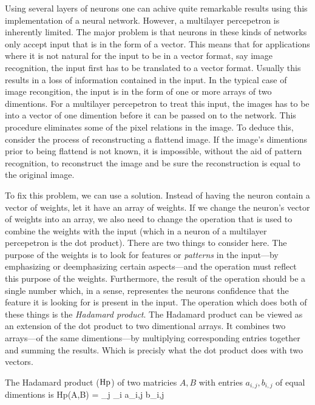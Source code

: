 Using several layers of neurons one can achive quite remarkable results using this implementation of a neural network.
However, a multilayer percepetron is inherently limited.
The major problem is that neurons in these kinds of networks only accept input that is in the form of a vector.
This means that for applications where it is not natural for the input to be in a vector format, say image recognition, the input first has to be translated to a vector format.
Usually this results in a loss of information contained in the input.
In the typical case of image recongition, the input is in the form of one or more arrays of two dimentions.
For a multilayer percepetron to treat this input, the images has to be  into a vector of one dimention before it can be passed on to the network.
This procedure eliminates some of the pixel relations in the image.
To deduce this, consider the process of reconstructing a flattend image.
If the image's dimentions prior to being flattend is not known, it is impossible, without the aid of pattern recognition, to reconstruct the image and be sure the reconstruction is equal to the original image.

To fix this problem, we can use a  solution.
Instead of having the neuron contain a vector of weights, let it have an array of weights.
If we change the neuron's vector of weights into an array, we also need to change the operation that is used to combine the weights with the input (which in a neuron of a multilayer percepetron is the dot product).
There are two things to consider here.
The purpose of the weights is to look for features or {\em patterns} in the input---by emphasizing or deemphasizing certain aspects---and the operation must reflect this purpose of the weights.
Furthermore, the result of the operation should be a single number which, in a sense, representes the neurons  confidence that the feature it is looking for is present in the input.
The operation which does both of these things is the {\em Hadamard product}.
The Hadamard product can be viewed as an extension of the dot product to two dimentional arrays.
It combines two arrays---of the same dimentions---by multiplying corresponding entries together and summing the results.
Which is precisly what the dot product does with two vectors.

The Hadamard product (${\rm Hp}$) of two matricies $A,B$ with entries $a_{i,j},b_{i,j}$ of equal dimentions is
\startplaceformula[reference=hdprod]
\startformula
{\rm Hp}(A,B) = \sum_{j} \sum_{i} a_{i,j} \cdot b_{i,j}
\stopformula
\stopplaceformula

